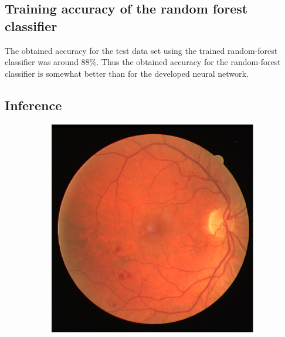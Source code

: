 \documentclass[aps,prb,10pt,twocolumn,groupedaddress]{revtex4-1}
\begin{document}
\subsection{Training accuracy of the random forest classifier}
\label{sec:results_random_forest_training}
The obtained accuracy for the test data set using the trained random-forest classifier was around 88\%. Thus the obtained accuracy for the random-forest classifier is somewhat better than for the developed neural network.

\subsection{Inference}
\label{sec:results_inference}
\begin{figure}[!t]
	\centering
	\begin{subfigure}[]{0.22\textwidth}
		\centering
		\includegraphics[width=\textwidth]{images/14_test.eps}
		\caption{}
	\end{subfigure}
	\hspace{0.25cm}
	\centering
	\begin{subfigure}[]{0.22\textwidth}
		\centering

\end{subfigure}
\end{figure}
\end{document}
